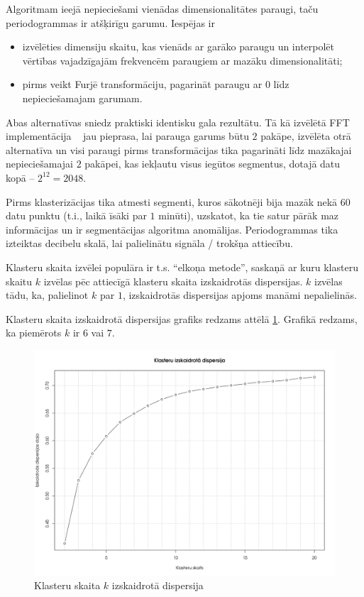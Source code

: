 \documentclass{ludis}
\begin{document}
Algoritmam ieejā nepieciešami vienādas dimensionalitātes paraugi, taču periodogrammas ir atšķirīgu
garumu. Iespējas ir 
\begin{itemize}
\item izvēlēties dimensiju skaitu, kas vienāds ar garāko paraugu un interpolēt vērtības 
  vaja\-dzīgajām frekvencēm paraugiem ar mazāku dimensionalitāti;
\item pirms veikt Furjē transformāciju, pagarināt paraugu ar $0$ līdz nepieciešamajam garumam.
\end{itemize}

Abas alternatīvas sniedz praktiski identisku gala rezultātu. Tā kā izvēlētā FFT
\linebreak implementācija ~\cite{commons_math} jau pieprasa, lai parauga garums būtu $2$ pakāpe, 
izvēlēta otrā alternatīva un visi paraugi pirms transformācijas tika pagarināti līdz mazākajai
nepieciešamajai $2$ pakāpei, kas iekļautu visus iegūtos segmentus, dotajā datu 
kopā -- $2^{12} = 2048$.

Pirms klasterizācijas tika atmesti segmenti, kuros sākotnēji bija mazāk nekā $60$ datu punktu (t.i.,
laikā īsāki par $1$ minūti), uzskatot, ka tie satur pārāk maz informācijas un ir segmentācijas
algoritma anomālijas. Periodogrammas tika izteiktas decibelu skalā, lai palielinātu signāla / 
trokšņa attiecību.

Klasteru skaita izvēlei populāra ir t.s. ``elkoņa metode'', saskaņā ar kuru klasteru skaitu $k$
izvēlas pēc attiecīgā klasteru skaita izskaidrotās dispersijas. $k$ izvēlas tādu, ka, palielinot
$k$ par $1$, izskaidrotās dispersijas apjoms manāmi nepalielinās.

Klasteru skaita izskaidrotā dispersijas grafiks redzams attēlā \ref{fig:kmeans_elbow}. Grafikā 
redzams, ka \linebreak piemērots $k$ ir $6$ vai $7$.

\begin{figure}
  \centering
  \includegraphics[scale=0.45]{img/kmeans_elbow}
  \caption{Klasteru skaita $k$ izskaidrotā dispersija}
  \label{fig:kmeans_elbow}
\end{figure}
\end{document}
